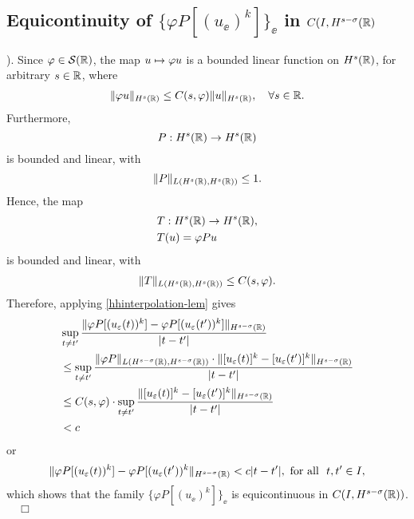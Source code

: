 \subsection{Equicontinuity of $\{ \varphi P [(u_\ee)^k]\}_\ee$  in $C(I,
H^{s-\sigma}(\mathbb{R})$}).
%
%
Since $\varphi \in \mathcal{S}(\mathbb{R})$, the map $u \mapsto \varphi u$
is a bounded linear function on $H^s(\mathbb{R})$, for arbitrary $s \in
\mathbb{R}$, where  
\begin{equation}
\begin{split}
\|\varphi u\|_{H^s(\mathbb{R})} \le C(s, \varphi)
\|u\|_{H^s(\mathbb{R})}, \quad \forall s\in \mathbb{R}.
\label{hhschwartz-estimate}
\end{split}
\end{equation}
Furthermore, $$P: H^s(\mathbb{R}) \to H^s(\mathbb{R})$$ is bounded and linear,
with 
\begin{equation}
\label{operator-normaa}
\|P\|_{L(H^s(\mathbb{R}), H^s(\mathbb{R}))} \le 1.
\end{equation}
Hence, the map 
\begin{equation}
\label{the-map}
\begin{split}
& T: H^s(\mathbb{R}) \to H^s(\mathbb{R}),
\\
& T(u) = \varphi P u 
\end{split}
\end{equation}
is bounded and linear, with 
\begin{equation}
\begin{split}
\|T\|_{L(H^s(\mathbb{R}), H^s(\mathbb{R}))} \le C(s, \varphi).
\label{op-norm-product}
\end{split}
\end{equation}
Therefore, applying \cref{hhinterpolation-lem} gives 
%
\begin{equation*}
\begin{split}
\label{hhequic-1}
& \sup_{t \neq t'} \frac {\| \varphi P [(u_\varepsilon(t))^k] - \varphi
P [(u_\varepsilon(t'))^k] \|_{H^{s -
\sigma  }(\mathbb{R})}}{|t - t'|}
\\
& \le \sup_{t \neq t'}  \frac {\|\varphi P \|_{L(H^{s-\sigma}(\mathbb{R}),
H^{s-\sigma}(\mathbb{R}))} \cdot \|   [u_\varepsilon(t)]^k  - 
[u_\varepsilon(t')]^k \|_{H^{s -
\sigma }(\mathbb{R})}}{|t - t'|}
\\
& \le C(s, \varphi) \cdot \sup_{t \neq t'}  \frac {\|   [u_\varepsilon(t)]^k  - 
[u_\varepsilon(t')]^k \|_{H^{s -
\sigma }(\mathbb{R})}}{|t - t'|}
\\
&< c
\end{split}
\end{equation*}
%
or
%
\begin{equation*}
\label{hhequic-2}
\|\varphi P [(u_\varepsilon(t))^k] - \varphi
P [(u_\varepsilon(t'))^k \|_{H^{s - \sigma }(\mathbb{R})}< c|t -
t'|, 
\ \text{for all} \   \,\,  t, t'\in I,
\end{equation*}
%
which shows that  the family  $\{\varphi P [(u_\ee)^k]\}_\ee$ is
equicontinuous in $C(I, H^{s-\sigma }(\mathbb{R}))$.  $\quad \Box$
%
%
%
%
%
%
%
%
%
%
%		

